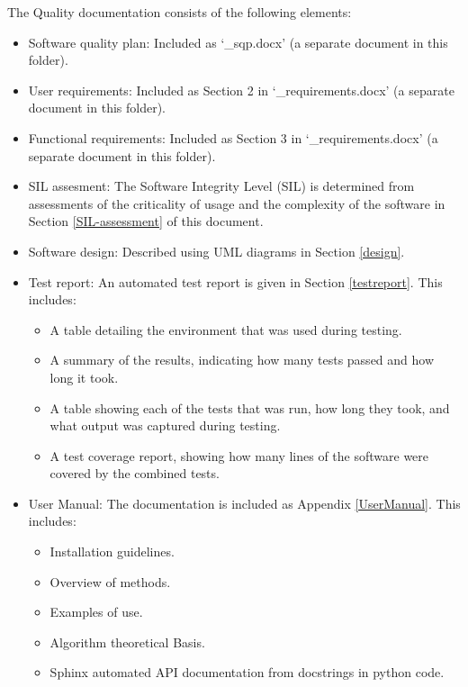 \documentclass{article}
\begin{document}
The Quality documentation consists of the following elements:
\begin{itemize}
\item Software quality plan: Included as `\packagename\_sqp.docx' (a separate document in this folder).

\item User requirements: Included as Section 2 in `\packagename\_requirements.docx' (a separate document in this folder).

\item Functional requirements: Included as Section 3 in `\packagename\_requirements.docx' (a separate document in this folder).

\item SIL assesment: The Software Integrity Level (SIL) is determined from assessments of the criticality of usage and the complexity of the software in Section \ref{SIL-assessment} of this document.

\item Software design: Described using UML diagrams in Section \ref{design}.

\item Test report: An automated test report is given in Section \ref{testreport}. This includes:
\begin{itemize}
\item A table detailing the environment that was used during testing.
\item A summary of the results, indicating how many tests passed and how long it took.
\item A table showing each of the tests that was run, how long they took, and what output was captured during testing.
\item A test coverage report, showing how many lines of the software were covered by the combined tests.
\end{itemize}
\item User Manual: The \packagename documentation is included as Appendix \ref{UserManual}. This includes:
\begin{itemize}
\item Installation guidelines.
\item Overview of methods.
\item Examples of use.
\item Algorithm theoretical Basis.
\item Sphinx automated API documentation from docstrings in python code.
\end{itemize}
\end{itemize}
\end{document}
